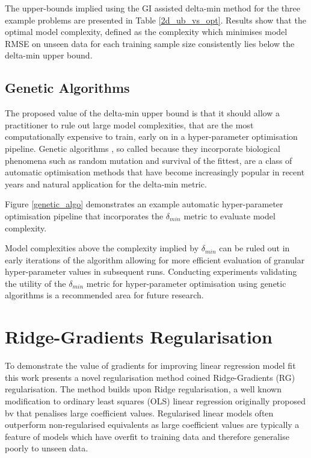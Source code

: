 \documentclass{article}
\begin{document}
The upper-bounds implied using the GI assisted delta-min method for the three example problems are presented in Table \ref{2d_ub_vs_opt}. Results show that the optimal model complexity, defined as the complexity which minimises model RMSE on unseen data for each training sample size consistently lies below the delta-min upper bound. 
 
\subsection{Genetic Algorithms}
\label{genetic_algos}

The proposed value of the delta-min upper bound is that it should allow a practitioner to rule out large model complexities, that are the most computationally expensive to train, early on in a hyper-parameter optimisation pipeline. Genetic algorithms \cite{mitchell1995genetic}, so called because they incorporate biological phenomena such as random mutation and survival of the fittest, are a class of automatic optimisation methods that have become increasingly popular in recent years and natural application for the delta-min metric.

Figure \ref{genetic_algo} demonstrates an example automatic hyper-parameter optimisation pipeline that incorporates the $\delta_{min}$ metric to evaluate model complexity. 

Model complexities above the complexity implied by $\delta_{min}$ can be ruled out in early iterations of the algorithm allowing for more efficient evaluation of granular hyper-parameter values in subsequent runs. Conducting experiments validating the utility of the $\delta_{min}$ metric for hyper-parameter optimisation using genetic algorithms is a recommended area for future research. 

\section{Ridge-Gradients Regularisation}
\label{rg_reg}
To demonstrate the value of gradients for improving linear regression model fit this work presents a novel regularisation method coined Ridge-Gradients (RG) regularisation. The method builds upon Ridge regularisation, a well known modification to ordinary least squares (OLS) linear regression originally proposed bv  \cite{hoerl1970ridge} that penalises large coefficient values. Regularised linear models often outperform non-regularised equivalents as large coefficient values are typically a feature of models which have overfit to training data and therefore generalise poorly to unseen data.
\end{document}
